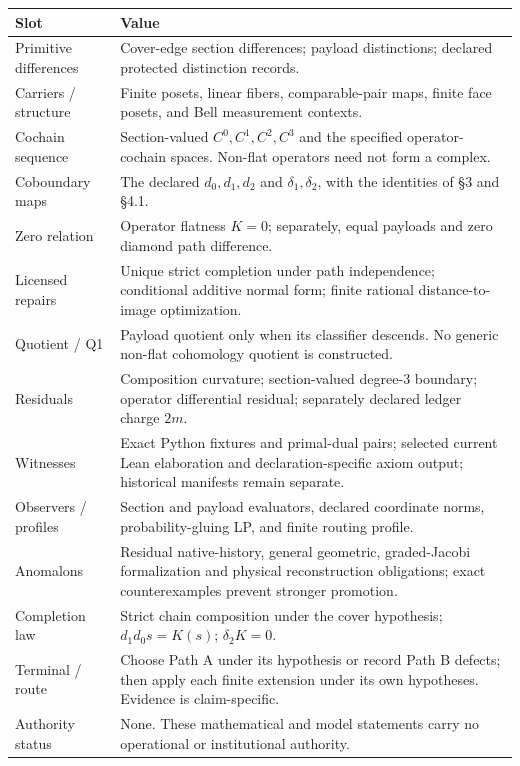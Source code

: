 \documentclass[
  english,
  10pt,
  a4paper,
]{article}
\begin{document}
\begin{longtable}[]{@{}
  >{\raggedright\arraybackslash}p{}
  >{\raggedright\arraybackslash}p{}@{}}
\toprule\noalign{}
\begin{minipage}[b]{\linewidth}\raggedright
Slot
\end{minipage} & \begin{minipage}[b]{\linewidth}\raggedright
Value
\end{minipage} \\
\midrule\noalign{}
\endhead
\bottomrule\noalign{}
\endlastfoot
Primitive differences & Cover-edge section differences; payload
distinctions; declared protected distinction records. \\
Carriers / structure & Finite posets, linear fibers, comparable-pair
maps, finite face posets, and Bell measurement contexts. \\
Cochain sequence & Section-valued \(C^0,C^1,C^2,C^3\) and the specified
operator-cochain spaces. Non-flat operators need not form a complex. \\
Coboundary maps & The declared \(d_0,d_1,d_2\) and
\(\delta_1,\delta_2\), with the identities of §3 and §4.1. \\
Zero relation & Operator flatness \(K=0\); separately, equal payloads
and zero diamond path difference. \\
Licensed repairs & Unique strict completion under path independence;
conditional additive normal form; finite rational distance-to-image
optimization. \\
Quotient / Q1 & Payload quotient only when its classifier descends. No
generic non-flat cohomology quotient is constructed. \\
Residuals & Composition curvature; section-valued degree-3 boundary;
operator differential residual; separately declared ledger charge
\(2m\). \\
Witnesses & Exact Python fixtures and primal-dual pairs; selected
current Lean elaboration and declaration-specific axiom output;
historical manifests remain separate. \\
Observers / profiles & Section and payload evaluators, declared
coordinate norms, probability-gluing LP, and finite routing profile. \\
Anomalons & Residual native-history, general geometric, graded-Jacobi
formalization and physical reconstruction obligations; exact
counterexamples prevent stronger promotion. \\
Completion law & Strict chain composition under the cover hypothesis;
\(d_1d_0s=K(s)\); \(\delta_2K=0\). \\
Terminal / route & Choose Path A under its hypothesis or record Path B
defects; then apply each finite extension under its own hypotheses.
Evidence is claim-specific. \\
Authority status & None. These mathematical and model statements carry
no operational or institutional authority. \\
\end{longtable}
\end{document}
